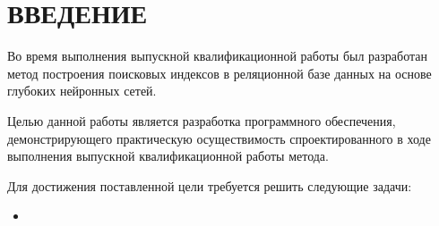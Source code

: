 \chapter*{ВВЕДЕНИЕ}

Во время выполнения выпускной квалификационной работы был разработан метод
построения поисковых индексов в реляционной базе данных на основе глубоких
нейронных сетей.

Целью данной работы является разработка программного обеспечения,
демонстрирующего практическую осуществимость спроектированного в ходе выполнения
выпускной квалификационной работы метода.

Для достижения поставленной цели требуется решить следующие задачи:
\begin{itemize}
    \item 
\end{itemize}

